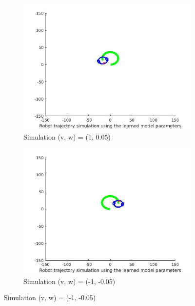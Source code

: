 \documentclass{article}
\begin{document}
\begin{figure}[ht]
	\begin{subfigure}{.5\textwidth}
		\centering
		\includegraphics[width=1.\linewidth]{3.jpg}  
		\caption{Simulation (v, w) = (1, 0.05)}
	\end{subfigure}
	\begin{subfigure}{.5\textwidth}
		\centering
		\includegraphics[width=1.\linewidth]{4.jpg}  
		\caption{Simulation (v, w) = (-1, -0.05)}
	\end{subfigure}
\end{figure}
\newpage
\end{document}
